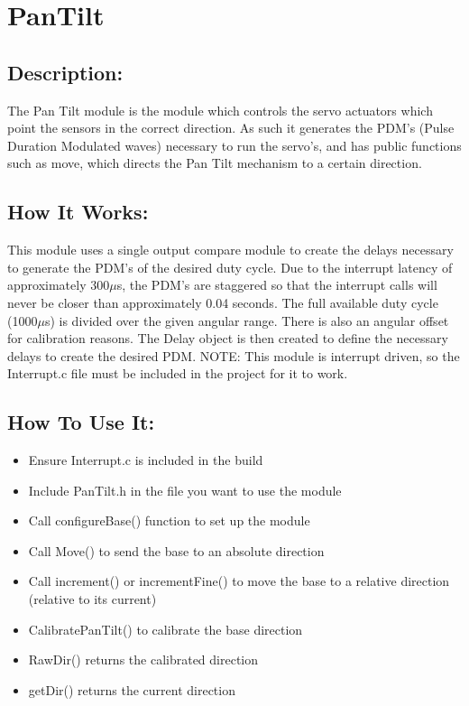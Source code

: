 \documentclass[]{report}
\begin{document}
\chapter{PanTilt}
\section{Description:}
The Pan Tilt module is the module which controls the servo actuators which point the sensors in the correct direction. As such it generates the PDM's (Pulse Duration Modulated waves) necessary to run the servo's, and has public functions such as move, which directs the Pan Tilt mechanism to a certain direction.

\section{How It Works:}
This module uses a single output compare module to create the delays necessary to generate the PDM's of the desired duty cycle. Due to the interrupt latency of approximately 300$\mu$s, the PDM's are staggered so that the interrupt calls will never be closer than approximately 0.04 seconds. The full available duty cycle (1000$\mu$s) is divided over the given angular range. There is also an angular offset for calibration reasons. The Delay object is then created to define the necessary delays to create the desired PDM.
NOTE: This module is interrupt driven, so the Interrupt.c file must be included in the project for it to work.

\section{How To Use It:}
\begin{itemize}
	\item Ensure Interrupt.c is included in the build
	\item Include PanTilt.h in the file you want to use the module
	\item Call configureBase() function to set up the module
	\item Call Move() to send the base to an absolute direction
	\item Call increment() or incrementFine() to move the base to a relative direction (relative to its current)
	\item CalibratePanTilt() to calibrate the base direction
	\item RawDir() returns the calibrated direction
	\item getDir() returns the current direction
\end{itemize}
\end{document}

